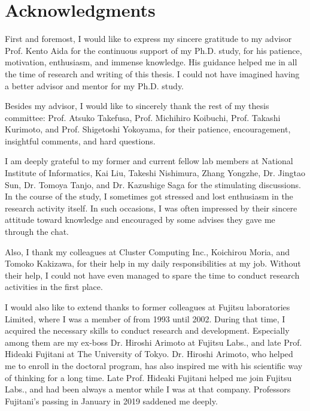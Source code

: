 \chapter*{Acknowledgments}


First and foremost, I would like to express my sincere gratitude to my advisor Prof. Kento Aida for the continuous support of my Ph.D. study, for his patience, motivation, enthusiasm, and immense knowledge.
His guidance helped me in all the time of research and writing of this thesis.
I could not have imagined having a better advisor and mentor for my Ph.D. study.



Besides my advisor, I would like to sincerely thank the rest of my thesis committee: Prof. Atsuko Takefusa, Prof. Michihiro Koibuchi, Prof. Takashi Kurimoto, and Prof. Shigetoshi Yokoyama, for their patience, encouragement, insightful comments, and hard questions.



I am deeply grateful to my former and current fellow lab members at National Institute of Informatics, Kai Liu, Takeshi Nishimura, Zhang Yongzhe, Dr. Jingtao Sun, Dr. Tomoya Tanjo, and Dr. Kazushige Saga for the stimulating discussions.
In the course of the study, I sometimes got stressed and lost enthusiasm in the research activity itself.
In such occasions, I was often impressed by their sincere attitude toward knowledge and encouraged by some advises they gave me through the chat.




Also, I thank my colleagues at Cluster Computing Inc., Koichirou Moria, and Tomoko Kakizawa, for their help in my daily responsibilities at my job.
Without their help, I could not have even managed to spare the time to conduct research activities in the first place.



I would also like to extend thanks to former colleagues at Fujitsu laboratories Limited, where I was a member of from 1993 until 2002.
During that time, I acquired the necessary skills to conduct research and development.
Especially among them are my ex-boss Dr. Hiroshi Arimoto at Fujitsu Labs., and late Prof. Hideaki Fujitani at The University of Tokyo.
Dr. Hiroshi Arimoto, who helped me to enroll in the doctoral program, has also inspired me with his scientific way of thinking for a long time.
Late Prof. Hideaki Fujitani helped me join Fujitsu Labs., and had been always a mentor while I was at that company.
Professors Fujitani's passing in January in 2019 saddened me deeply.



